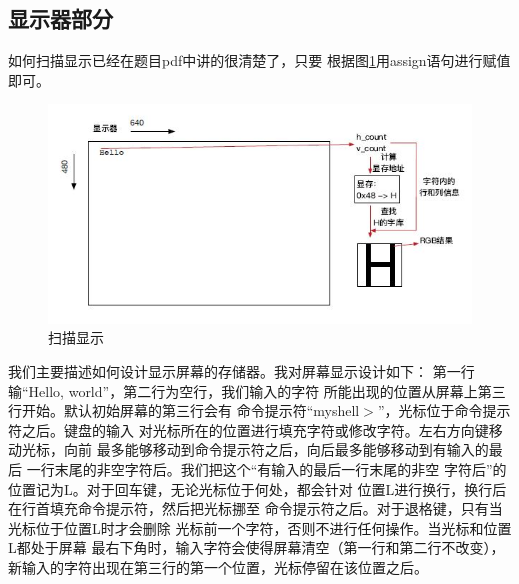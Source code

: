 \documentclass[12pt,a4paper,UTF8]{article}
\begin{document}
\subsection{显示器部分}
如何扫描显示已经在题目pdf中讲的很清楚了，只要
根据图\ref*{scan_display}用assign语句进行赋值
即可。
\begin{figure}[H]
  \centering
  \includegraphics[width=1\textwidth]{scan_display.JPG}
  \caption{扫描显示}
  \label{scan_display}
\end{figure}

我们主要描述如何设计显示屏幕的存储器。我对屏幕显示设计如下：
第一行输``Hello, world''，第二行为空行，我们输入的字符
所能出现的位置从屏幕上第三行开始。默认初始屏幕的第三行会有
命令提示符``myshell$>$''，光标位于命令提示符之后。键盘的输入
对光标所在的位置进行填充字符或修改字符。左右方向键移动光标，向前
最多能够移动到命令提示符之后，向后最多能够移动到有输入的最后
一行末尾的非空字符后。我们把这个``有输入的最后一行末尾的非空
字符后''的位置记为L。对于回车键，无论光标位于何处，都会针对
位置L进行换行，换行后在行首填充命令提示符，然后把光标挪至
命令提示符之后。对于退格键，只有当光标位于位置L时才会删除
光标前一个字符，否则不进行任何操作。当光标和位置L都处于屏幕
最右下角时，输入字符会使得屏幕清空（第一行和第二行不改变），
新输入的字符出现在第三行的第一个位置，光标停留在该位置之后。
\end{document}
